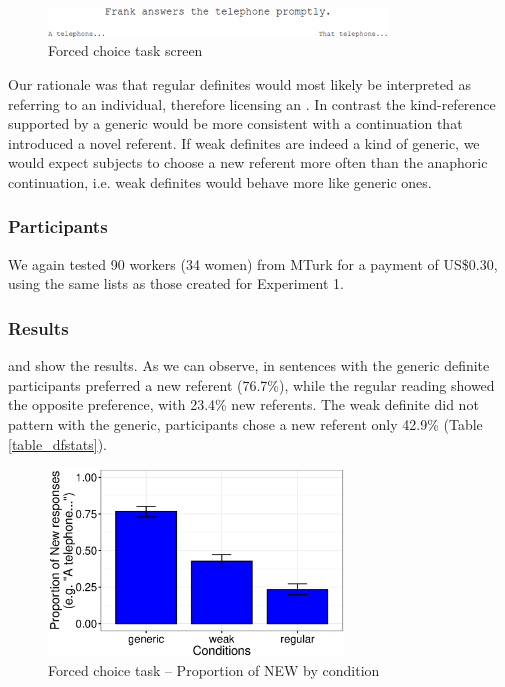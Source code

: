 \documentclass[output=paper,
modfonts
]{langscibook}
\begin{document}
\begin{figure}[H]
\centering
\includegraphics[width=0.8\textwidth]{figures/fig_fcinput}
\caption{Forced choice task screen}
\label{fig:desaetal:6}
\end{figure}

Our rationale was that regular definites would most likely be interpreted as referring to an individual, therefore licensing an .  In contrast the kind-reference supported by a generic would be more consistent with a continuation that introduced a novel referent. If weak definites are indeed a kind of generic, we would expect subjects to choose a new referent more often than the anaphoric continuation, i.e. weak definites would behave more like generic ones. 

\subsubsection{Participants}

We again tested 90 workers (34 women) from MTurk for a payment of US\$0.30, using the same lists as those created for Experiment 1. 

\subsubsection{Results}

 and  show the results. As we can observe,  in sentences with the generic definite participants preferred a new referent (76.7\%), while the regular reading showed the opposite preference, with 23.4\% new referents. The weak definite did not pattern with the generic, participants chose a new referent only 42.9\% (Table \ref{table_dfstats}). 

\begin{figure}[p]
\centering
\includegraphics[width=0.7\textwidth]{figures/graf_fcnovoia}
\caption{Forced choice task -- Proportion of NEW by condition}
\label{fig:desaetal:7}
\end{figure}
\end{document}
